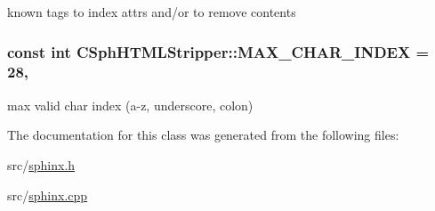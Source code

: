 known tags to index attrs and/or to remove contents 

\hypertarget{classCSphHTMLStripper_acb1842ca8b483ff8df6ea3648fbca5ff}{
\subsubsection[{M\-A\-X\-\_\-\-C\-H\-A\-R\-\_\-\-I\-N\-D\-E\-X}]{\setlength{\rightskip}{0pt plus 5cm}const {\bf int} C\-Sph\-H\-T\-M\-L\-Stripper\-::\-M\-A\-X\-\_\-\-C\-H\-A\-R\-\_\-\-I\-N\-D\-E\-X = 28\hspace{0.3cm}{\ttfamily [static]}, {\ttfamily [protected]}}}\label{classCSphHTMLStripper_acb1842ca8b483ff8df6ea3648fbca5ff}


max valid char index (a-\/z, underscore, colon) 



The documentation for this class was generated from the following files\-:\begin{DoxyCompactItemize}
\item 
src/\hyperlink{sphinx_8h}{sphinx.\-h}\item 
src/\hyperlink{sphinx_8cpp}{sphinx.\-cpp}\end{DoxyCompactItemize}
